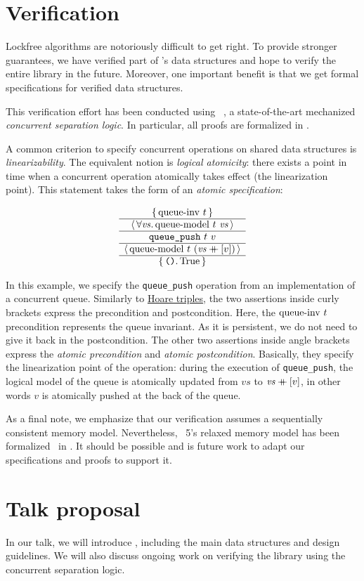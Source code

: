 \documentclass[a4paper, 11pt]{article}
\begin{document}
\section{Verification}

Lockfree algorithms are notoriously difficult to get right.
To provide stronger guarantees, we have verified part of \Saturn's data structures and hope to verify the entire library in the future.
Moreover, one important benefit is that we get formal specifications for verified data structures.

This verification effort has been conducted using \Iris~\cite{DBLP:journals/jfp/JungKJBBD18}, a state-of-the-art mechanized \emph{concurrent separation logic}.
In particular, all proofs are formalized in \Coq.

A common criterion to specify concurrent operations on shared data structures is \emph{linearizability}.
The equivalent \Iris notion is \emph{logical atomicity}: there exists a point in time when a concurrent operation atomically takes effect (the linearization point).
This statement takes the form of an \emph{atomic specification}:

\[
  \begin{array}{c} \left\lbrace\, 
    \mathrm{queue {\hbox{-}} inv}\ t
   \,\right\rbrace \\ \hline \left\langle\, \forall 
    \mathit{vs}
   \ldotp 
    \mathrm{queue {\hbox{-}} model}\ t\  \mathit{vs}
   \,\right\rangle \\ \hline 
    \texttt{queue\_push}\ t\ v
   \\ \hline \left\langle\, 
    \mathrm{queue {\hbox{-}} model}\ t\  (\mathit{vs} \mathbin{+\mkern-10mu+} [v])
   \,\right\rangle \\ \hline \left\lbrace\, 
    \texttt{()}
   \ldotp 
    \mathrm{True}
   \,\right\rbrace \end{array}
\]

In this example, we specify the \texttt{queue\_push} operation from an implementation of a concurrent queue.
Similarly to \href{https://en.wikipedia.org/wiki/Hoare_logic}{Hoare triples}, the two assertions inside curly brackets express the precondition and postcondition.
Here, the $\mathrm{queue {\hbox{-}} inv}\ t$ precondition represents the queue invariant.
As it is persistent, we do not need to give it back in the postcondition.
The other two assertions inside angle brackets express the \emph{atomic precondition} and \emph{atomic postcondition}.
Basically, they specify the linearization point of the operation: during the execution of \texttt{queue\_push}, the logical model of the queue is atomically updated from $\mathit{vs}$ to $\mathit{vs} \mathbin{+\mkern-10mu+} [v]$, in other words $v$ is atomically pushed at the back of the queue.

As a final note, we emphasize that our verification assumes a sequentially consistent memory model.
Nevertheless, \OCaml~5's relaxed memory model has been formalized~\cite{DBLP:journals/pacmpl/MevelJP20} in \Iris.
It should be possible and is future work to adapt our specifications and proofs to support it.

\section{Talk proposal}

In our talk, we will introduce \Saturn, including the main data structures and design guidelines.
We will also discuss ongoing work on verifying the library using the \Iris concurrent separation logic.

\printbibliography
\end{document}
